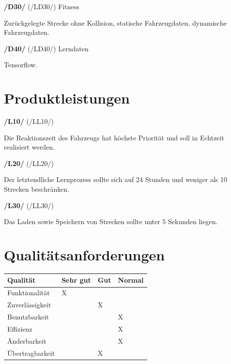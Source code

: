 \documentclass[11pt,a4paper]{article}
\begin{document}
	\noindent\large\textbf{/D30/} (/LD30/) Fitness
	\normalsize \\
	\begin{addmargin}{0.1 \textwidth}
		Zurückgelegte Strecke ohne Kollision, statische Fahrzeugdaten, dynamische Fahrzeugdaten.\\
	\end{addmargin}

	\noindent\large\textbf{/D40/} (/LD40/) Lerndaten
	\normalsize \\
	\begin{addmargin}{0.1 \textwidth}
		Tensorflow.\\
	\end{addmargin}

	\pagebreak
	\section{Produktleistungen}
	\noindent\large\textbf{/L10/} (/LL10/) 
	\normalsize \\
	\begin{addmargin}{0.1 \textwidth}
		Die Reaktionszeit des Fahrzeugs hat höchste Priorität und soll in Echtzeit realisiert werden.\\
	\end{addmargin}

	\noindent\large\textbf{/L20/} (/LL20/) 
	\normalsize \\
	\begin{addmargin}{0.1 \textwidth}
		Der letztendliche Lernprozess sollte sich auf 24 Stunden und weniger als 10 Strecken beschränken.\\
	\end{addmargin}
	
	\noindent\large\textbf{/L30/} (/LL30/) 
	\normalsize \\
	\begin{addmargin}{0.1 \textwidth}
		Das Laden sowie Speichern von Strecken sollte unter 5 Sekunden liegen.\\
	\end{addmargin}

	\section{Qualitätsanforderungen}
	\begin{center}
		\begin{tabular}{|l|C{50pt}|C{50pt}|C{50pt}|}
			\hline 
			\textbf{Qualität} & \textbf{Sehr gut} & \textbf{Gut} & \textbf{Normal} \\ 
			\hline 
			Funktionalität & X &  &  \\ 
			\hline 
			Zuverlässigkeit &  & X &  \\ 
			\hline 
			Benutzbarkeit &  &  & X \\ 
			\hline 
			Effizienz &  &  & X \\ 
			\hline 
			Änderbarkeit &  &  & X \\ 
			\hline 
			Übertragbarkeit &  & X &  \\ 
			\hline 
		\end{tabular} 
	\end{center}
\end{document}
